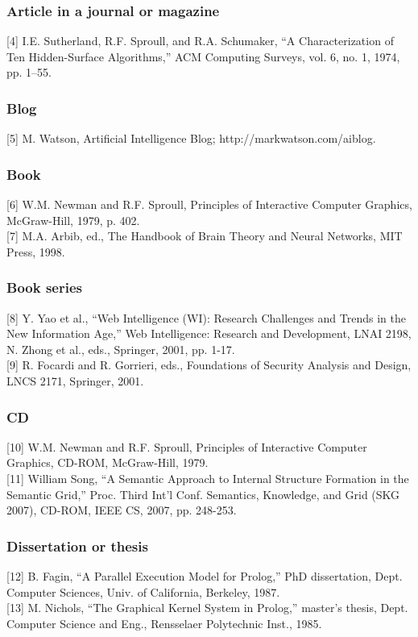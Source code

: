 \documentclass[11pt, onecolumn, twoside, a4paper]{article}
\begin{document}
\subsubsection{Article in a journal or magazine}
[4] I.E. Sutherland, R.F. Sproull, and R.A. Schumaker, ``A Characterization of Ten Hidden-Surface Algorithms,'' ACM Computing Surveys, vol. 6, no. 1, 1974, pp. 1–55.
\subsubsection{Blog}
[5] M. Watson, Artificial Intelligence Blog; http://markwatson.com/aiblog.
\subsubsection{Book}
[6] W.M. Newman and R.F. Sproull, Principles of Interactive Computer Graphics, McGraw-Hill, 1979, p. 402.
\\[1mm]
[7] M.A. Arbib, ed., The Handbook of Brain Theory and Neural Networks, MIT Press, 1998.
\subsubsection{Book series}
[8] Y. Yao et al., ``Web Intelligence (WI): Research Challenges and Trends in the New Information Age,'' Web Intelligence: Research and Development, LNAI 2198, N. Zhong et al., eds., Springer, 2001, pp. 1-17. 
\\[1mm]
[9] R. Focardi and R. Gorrieri, eds., Foundations of Security Analysis and Design, LNCS 2171, Springer, 2001.
\subsubsection{CD}
[10] W.M. Newman and R.F. Sproull, Principles of Interactive Computer Graphics, CD-ROM, McGraw-Hill, 1979.
\\[1mm]
[11] William Song, ``A Semantic Approach to Internal Structure Formation in the Semantic Grid,'' Proc. Third Int'l Conf. Semantics, Knowledge, and Grid (SKG 2007), CD-ROM, IEEE CS, 2007, pp. 248-253.
\subsubsection{Dissertation or thesis}
[12] B. Fagin, ``A Parallel Execution Model for Prolog,'' PhD dissertation, Dept. Computer Sciences, Univ. of California, Berkeley, 1987.
\\[1mm]
[13] M. Nichols, ``The Graphical Kernel System in Prolog,'' master's thesis, Dept. Computer Science and Eng., Rensselaer Polytechnic Inst., 1985.
\end{document}
